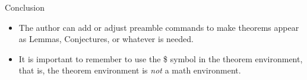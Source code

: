 \documentclass[pdf]{prosper}
\begin{document}
\begin{slide}{Conclusion}
	\begin{itemize}
		\item The author can add or adjust preamble commands to make theorems appear as Lemmas, Conjectures, or whatever is needed.
		\item It is important to remember to use the \$ symbol in the theorem environment, that is, the theorem environment is \emph{not} a math environment.
	\end{itemize}
\end{slide}
\end{document}
